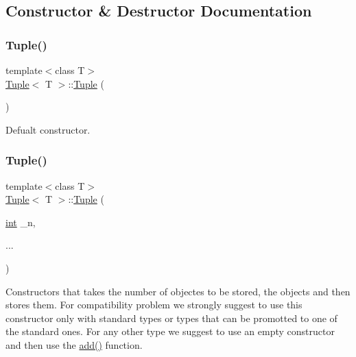 \subsection{Constructor \& Destructor Documentation}
\mbox{\label{class_tuple_ae8bde0e2215d6d5235a2a45195f7bfae}} 
\subsubsection{\texorpdfstring{Tuple()}{Tuple()}\hspace{0.1cm}{\footnotesize\ttfamily [1/2]}}
{\footnotesize\ttfamily template$<$class T$>$ \\
\mbox{\hyperlink{class_tuple}{Tuple}}$<$ T $>$\+::\mbox{\hyperlink{class_tuple}{Tuple}} (\begin{DoxyParamCaption}{ }\end{DoxyParamCaption})\hspace{0.3cm}{\ttfamily [inline]}}



Defualt constructor. 

\mbox{\label{class_tuple_af64f6017bf08af095addedf084863f22}} 
\subsubsection{\texorpdfstring{Tuple()}{Tuple()}\hspace{0.1cm}{\footnotesize\ttfamily [2/2]}}
{\footnotesize\ttfamily template$<$class T$>$ \\
\mbox{\hyperlink{class_tuple}{Tuple}}$<$ T $>$\+::\mbox{\hyperlink{class_tuple}{Tuple}} (\begin{DoxyParamCaption}\item[{\mbox{\hyperlink{draw_8hh_aa620a13339ac3a1177c86edc549fda9b}{int}}}]{\+\_\+n,  }\item[{}]{... }\end{DoxyParamCaption})\hspace{0.3cm}{\ttfamily [inline]}}



Constructors that takes the number of objectes to be stored, the objects and then stores them. For compatibility problem we strongly suggest to use this constructor only with standard types or types that can be promotted to one of the standard ones. For any other type we suggest to use an empty constructor and then use the {\ttfamily \mbox{\hyperlink{class_tuple_a5d3ee2809d790543195a6e2075aef7d0}{add()}}} function. 


